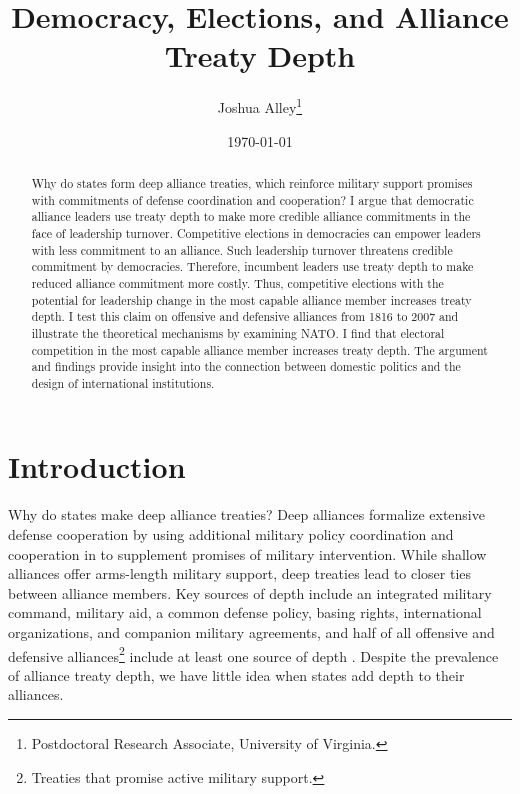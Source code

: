 \documentclass[12pt]{article}
\title{\textbf{Democracy, Elections, and Alliance Treaty Depth}}
\author{Joshua Alley\footnote{Postdoctoral Research Associate,
University of Virginia.}}
\date{\today}
\begin{document}
\maketitle 

\doublespace 

\begin{abstract}
Why do states form deep alliance treaties, which reinforce military support promises with commitments of defense coordination and cooperation? 
I argue that democratic alliance leaders use treaty depth to make more credible alliance commitments in the face of leadership turnover. 
Competitive elections in democracies can empower leaders with less commitment to an alliance. 
Such leadership turnover threatens credible commitment by democracies. 
Therefore, incumbent leaders use treaty depth to make reduced alliance commitment more costly. 
Thus, competitive elections with the potential for leadership change in the most capable alliance member increases treaty depth.
I test this claim on offensive and defensive alliances from 1816 to 2007 and illustrate the theoretical mechanisms by examining NATO.
I find that electoral competition in the most capable alliance member increases treaty depth. 
The argument and findings provide insight into the connection between domestic politics and the design of international institutions. 
\end{abstract}


\newpage 


\section{Introduction}


Why do states make deep alliance treaties? 
Deep alliances formalize extensive defense cooperation by using additional military policy coordination and cooperation in to supplement promises of military intervention. 
While shallow alliances offer arms-length military support, deep treaties lead to closer ties between alliance members. 
Key sources of depth include an integrated military command, military aid, a common defense policy, basing rights, international organizations, and companion military agreements, and half of all offensive and defensive alliances\footnote{Treaties that promise active military support.} include at least one source of depth \citep{Leedsetal2002}. 
Despite the prevalence of alliance treaty depth, we have little idea when states add depth to their alliances. 
\end{document}
